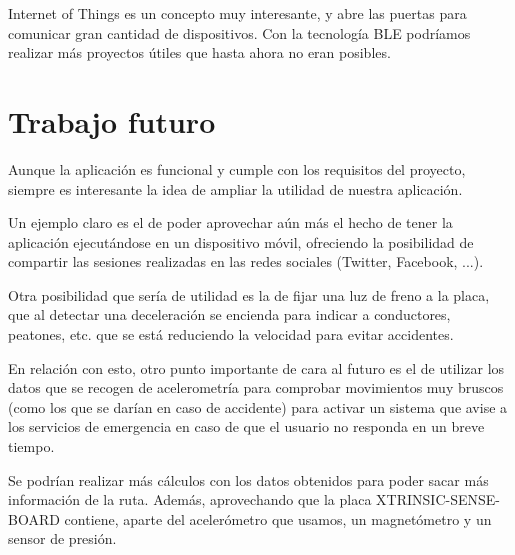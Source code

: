 Internet of Things es un concepto muy interesante, y abre las puertas para comunicar gran cantidad de dispositivos. Con la tecnología BLE podríamos realizar más proyectos útiles que hasta ahora no eran posibles.

\section{Trabajo futuro}

Aunque la aplicación es funcional y cumple con los requisitos del proyecto, siempre es interesante la idea de ampliar la utilidad de nuestra aplicación.

Un ejemplo claro es el de poder aprovechar aún más el hecho de tener la aplicación ejecutándose en un dispositivo móvil, ofreciendo la posibilidad de compartir las sesiones realizadas en las redes sociales (Twitter, Facebook, ...).

Otra posibilidad que sería de utilidad es la de fijar una luz de freno a la placa, que al detectar una deceleración se encienda para indicar a conductores, peatones, etc. que se está reduciendo la velocidad para evitar accidentes.

En relación con esto, otro punto importante de cara al futuro es el de utilizar los datos que se recogen de acelerometría para comprobar movimientos muy bruscos (como los que se darían en caso de accidente) para activar un sistema que avise a los servicios de emergencia en caso de que el usuario no responda en un breve tiempo.

Se podrían realizar más cálculos con los datos obtenidos para poder sacar más información de la ruta. Además, aprovechando que la placa XTRINSIC-SENSE-BOARD contiene, aparte del acelerómetro que usamos, un magnetómetro y un sensor de presión. 

